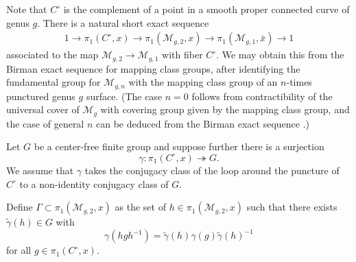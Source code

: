 Note that $C^\circ$ is the complement of a point in a smooth proper connected curve of genus $g$.
There is a natural short exact sequence
\begin{align}
1\to \pi_1(C^\circ, x) \to \pi_1(\mathscr M_{g,2}, x) \to \pi_1(\mathscr
M_{g,1}, \bar x)\to 1
\end{align}
associated to the map $\mathscr{M}_{g,2} \to \mathscr{M}_{g,1}$ with fiber
$C^{\circ}$.
We may obtain this from the Birman exact sequence \cite[Theorem
4.6]{farbM:a-primer} for mapping class groups,
after identifying the fundamental group for $\mathscr M_{g,n}$ with the mapping
class group of an $n$-times punctured genus $g$ surface.
(The case $n = 0$ follows from contractibility of the universal cover of
$\mathscr M_g$ \cite[Theorem 10.6]{farbM:a-primer} with covering group given by
the mapping class group,
and the case of general $n$ can be deduced from the Birman exact sequence
\cite[Theorem 4.6]{farbM:a-primer}.)

Let $G$ be a center-free finite group and suppose further there
is a surjection $$\gamma: \pi_1(C^\circ, x)\twoheadrightarrow G.$$
We assume that $\gamma$ takes the conjugacy class of the loop around the puncture of $C^\circ$ to a non-identity conjugacy class of $G$.

Define $\Gamma\subset \pi_1(\mathscr{M}_{g,2}, x)$ as the set of $h \in
\pi_1(\mathscr{M}_{g,2},x)$ such that there exists $\widetilde{\gamma}(h)\in G$ with $$\gamma(hgh^{-1})=\widetilde{\gamma}(h)\gamma(g)\widetilde{\gamma}(h)^{-1}$$ for all $g\in \pi_1(C^\circ, x).$

